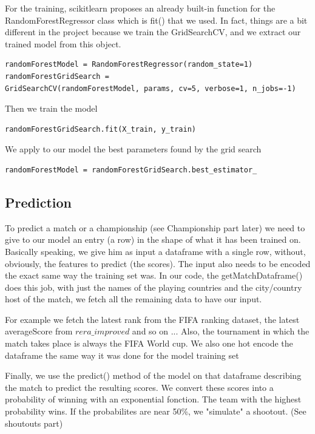 For the training, scikitlearn proposes an already built-in function for the RandomForestRegressor class which is fit() that we used.
In fact, things are a bit different in the project because we train the GridSearchCV, and we extract our trained model from this object.

\begin{verbatim}
randomForestModel = RandomForestRegressor(random_state=1)
randomForestGridSearch = 
GridSearchCV(randomForestModel, params, cv=5, verbose=1, n_jobs=-1)
\end{verbatim}

\noindent Then we train the model
\begin{verbatim}
randomForestGridSearch.fit(X_train, y_train)
\end{verbatim}

\noindent We apply to our model the best parameters found by the grid search
\begin{verbatim}
randomForestModel = randomForestGridSearch.best_estimator_
\end{verbatim}


\subsection{Prediction}
To predict a match or a championship (see Championship part later) we need to give to our model an entry (a row) in the shape of what it has been trained on. Basically speaking, we give him as input a dataframe with a single row, without, obviously, the features to predict (the scores).
The input also needs to be encoded the exact same way the training set was.
In our code, the getMatchDataframe() does this job, with just the names of the playing countries and the city/country host of the match, we fetch all the remaining data to have our input.

For example we fetch the latest rank from the FIFA ranking dataset, the latest averageScore from $rera\_improved$ and so on ...
Also, the tournament in which the match takes place is always the FIFA World cup.
We also one hot encode the dataframe the same way it was done for the model training set

Finally, we use the predict() method of the model on that dataframe describing the match to predict the resulting scores.
We convert these scores into a probability of winning with an exponential fonction. The team with the highest probability wins. If the probabilites are near 50\%, we "simulate" a shootout. (See shoutouts part)

